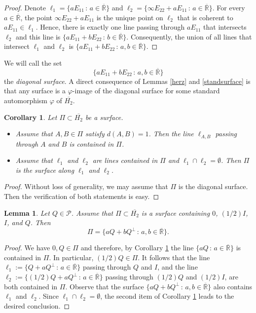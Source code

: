 \documentclass[10pt,a4paper]{amsart}
\providecommand{\index}[1]{}
\newcommand\oH{{\overline{H_2}}}
\newcommand\oR{{\overline{\mathbb{R}}}}
\newtheorem{lemma}[theorem]{Lemma}
\newtheorem{corollary}[theorem]{Corollary}
\theoremstyle{definition}
\theoremstyle{remark}
\numberwithin{subsection}{section}
\numberwithin{equation}{section}
\begin{document}
\begin{proof}
Denote $\ell_1 = \{ a E_{11} \, : \, a \in {\oR} \}$ and $\ell_2 = \{  \infty E_{22}  + a E_{11} \, : \, a \in {\oR} \}$.
For every $a \in {\oR}$, the point $\infty E_{22}  + a E_{11}$ is the unique point on $\ell_2$ that is coherent to $aE_{11} \in \ell_1$. Hence, there is exactly one line passing through $aE_{11}$ that intersects $\ell_2$ and this line is $\{ a E_{11} + b E_{22} \, : \, b \in {\oR} \}$. Consequently, the union of all lines that intersect  $\ell_1$ and $\ell_2$ is
$\{ a E_{11} + b E_{22} \, : \, a,b \in {\oR} \}$.
\end{proof}

We will call the set 
\begin{equation}\label{ds}
\{ a E_{11} + b E_{22} \, : \, a,b \in {\oR} \}
\end{equation}
the \emph{diagonal surface}\index{diagonal surface}.
A direct consequence of Lemmas \ref{herz} and \ref{standsurface} is that any surface is a $\varphi$-image of the diagonal surface for some standard automorphism $\varphi$ of $\oH$.

\begin{corollary}\label{ilja}
Let $\Pi \subset \oH$ be a surface. 
\begin{itemize}
\item Assume that $A,B \in \Pi$ satisfy $d(A,B) = 1$. Then the line $\ell_{A, B}$ passing through $A$ and $B$ is contained in $\Pi$. 
\item Assume that $\ell_1$ and $\ell_2$ are lines contained in $\Pi$ and $\ell_1 \cap \ell_2 = \emptyset$. Then $\Pi$ is the surface along $\ell_1$ and $\ell_2$.
\end{itemize}
\end{corollary}

\begin{proof}
Without loss of generality, we may assume that $\Pi$ is the diagonal surface. Then the verification of both statements is easy.
\end{proof}



\begin{lemma}\label{svinj}
Let $Q \in \mathcal{P}$. Assume that $\Pi \subset \oH$ is a surface containing $0$, $(1/2)I$, $I$, and $Q$. Then
\[
\Pi = \{ a Q + b Q^\perp \, : \, a,b \in {\oR} \}.
\]
\end{lemma}

\begin{proof}
We have $0,Q \in \Pi$ and therefore, by Corollary \ref{ilja} the line $\{ a Q  \, : \, a \in {\oR} \}$ is contained in $\Pi$. In particular, $(1/2)Q\in \Pi$. 
It follows that the line $\ell_1 := \{Q+aQ^\perp\,:\, a\in {\oR}\}$ passing through $Q$ and $I$, and the line $\ell_2 := \{(1/2)Q+aQ^\perp\,:\, a\in {\oR}\}$ passing through $(1/2)Q$ and $(1/2)I$, are both contained in $\Pi$. 
Observe that the surface $\{ a Q + b Q^\perp \, : \, a,b \in {\oR} \}$ also contains $\ell_1$ and $\ell_2$.
Since $\ell_1\cap \ell_2=\emptyset$, the second item of Corollary \ref{ilja} leads to the desired conclusion.
\end{proof}
\end{document}
